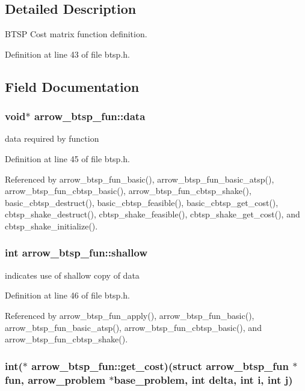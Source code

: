 \subsection{Detailed Description}
BTSP Cost matrix function definition. 

Definition at line 43 of file btsp.h.

\subsection{Field Documentation}
\hypertarget{structarrow__btsp__fun_9c1a276685fb0cac372faef2dd2ba99a}{
\subsubsection{\setlength{\rightskip}{0pt plus 5cm}void$\ast$ {\bf arrow\_\-btsp\_\-fun::data}}}
\label{structarrow__btsp__fun_9c1a276685fb0cac372faef2dd2ba99a}


data required by function 

Definition at line 45 of file btsp.h.

Referenced by arrow\_\-btsp\_\-fun\_\-basic(), arrow\_\-btsp\_\-fun\_\-basic\_\-atsp(), arrow\_\-btsp\_\-fun\_\-cbtsp\_\-basic(), arrow\_\-btsp\_\-fun\_\-cbtsp\_\-shake(), basic\_\-cbtsp\_\-destruct(), basic\_\-cbtsp\_\-feasible(), basic\_\-cbtsp\_\-get\_\-cost(), cbtsp\_\-shake\_\-destruct(), cbtsp\_\-shake\_\-feasible(), cbtsp\_\-shake\_\-get\_\-cost(), and cbtsp\_\-shake\_\-initialize().\hypertarget{structarrow__btsp__fun_1950686e4862a4b1bd68d1ada85e2c79}{
\subsubsection{\setlength{\rightskip}{0pt plus 5cm}int {\bf arrow\_\-btsp\_\-fun::shallow}}}
\label{structarrow__btsp__fun_1950686e4862a4b1bd68d1ada85e2c79}


indicates use of shallow copy of data 

Definition at line 46 of file btsp.h.

Referenced by arrow\_\-btsp\_\-fun\_\-apply(), arrow\_\-btsp\_\-fun\_\-basic(), arrow\_\-btsp\_\-fun\_\-basic\_\-atsp(), arrow\_\-btsp\_\-fun\_\-cbtsp\_\-basic(), and arrow\_\-btsp\_\-fun\_\-cbtsp\_\-shake().\hypertarget{structarrow__btsp__fun_56eb57e90eae76571a024894bd0fe570}{
\subsubsection{\setlength{\rightskip}{0pt plus 5cm}int($\ast$ {\bf arrow\_\-btsp\_\-fun::get\_\-cost})(struct {\bf arrow\_\-btsp\_\-fun} $\ast$fun, {\bf arrow\_\-problem} $\ast$base\_\-problem, int delta, int i, int j)}}
\label{structarrow__btsp__fun_56eb57e90eae76571a024894bd0fe570}



